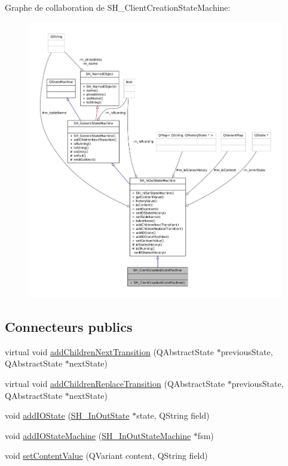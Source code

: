 Graphe de collaboration de S\-H\-\_\-\-Client\-Creation\-State\-Machine\-:
\nopagebreak
\begin{figure}[H]
\begin{center}
\leavevmode
\includegraphics[width=350pt]{classSH__ClientCreationStateMachine__coll__graph}
\end{center}
\end{figure}
\subsection*{Connecteurs publics}
\begin{DoxyCompactItemize}
\item 
virtual void \hyperlink{classSH__InOutStateMachine_aa78420f8778d7777809aad77eb8473b4}{add\-Children\-Next\-Transition} (Q\-Abstract\-State $\ast$previous\-State, Q\-Abstract\-State $\ast$next\-State)
\item 
virtual void \hyperlink{classSH__InOutStateMachine_ae0f3b4622d2c70884bb224dee86e95c0}{add\-Children\-Replace\-Transition} (Q\-Abstract\-State $\ast$previous\-State, Q\-Abstract\-State $\ast$next\-State)
\item 
void \hyperlink{classSH__InOutStateMachine_a2528cffddbe6f98c32ebef41423c0118}{add\-I\-O\-State} (\hyperlink{classSH__InOutState}{S\-H\-\_\-\-In\-Out\-State} $\ast$state, Q\-String field)
\item 
void \hyperlink{classSH__InOutStateMachine_a6f65dff277508e650eb697628c857b19}{add\-I\-O\-State\-Machine} (\hyperlink{classSH__InOutStateMachine}{S\-H\-\_\-\-In\-Out\-State\-Machine} $\ast$fsm)
\item 
void \hyperlink{classSH__InOutStateMachine_a9ab1534306b2bdb62743d4bcefe40c17}{set\-Content\-Value} (Q\-Variant content, Q\-String field)
\end{DoxyCompactItemize}
